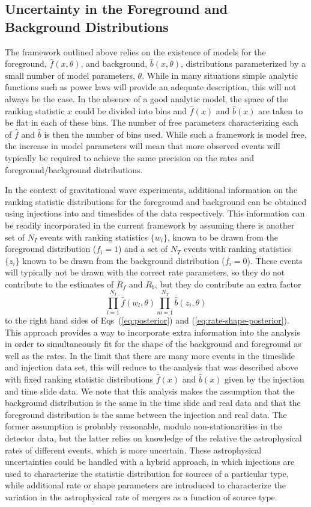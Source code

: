 \documentclass[aps,prd,reprint,nofootinbib]{revtex4-1}
\newcommand{\be}{\begin{equation}}
\newcommand{\ee}{\end{equation}}
\begin{document}
\subsection{Uncertainty in the Foreground and Background Distributions}
\label{sec:uncertain-dist}
The framework outlined above relies on the existence of models for the foreground, $\hat{f}(x,\theta)$, and background, $\hat{b}(x,\theta)$, distributions parameterized by a small number of model parameters, $\theta$. While in many situations simple analytic functions such as power laws will provide an adequate description, this will not always be the case. In the absence of a good analytic model, the space of the ranking statistic $x$ could be divided into bins and $\hat{f}(x)$ and $\hat{b}(x)$ are taken to be flat in each of these bins. The number of free parameters characterizing each of $\hat{f}$ and $\hat{b}$ is then the number of bins used. While such a framework is model free, the increase in model parameters will mean that more observed events will typically be required to achieve the same precision on the rates and foreground/background distributions.

In the context of gravitational wave experiments, additional information on the ranking statistic distributions for the foreground and background can be obtained using injections into and timeslides of the data respectively. This information can be readily incorporated in the current framework by assuming there is another set of $N_I$ events with ranking statistics $\{ w_i \}$, known to be drawn from the foreground distribution ($f_i=1$) and a set of $N_T$ events with ranking statistics $\{z_i\}$ known to be drawn from the background distribution ($f_i=0$). These events will typically not be drawn with the correct rate parameters, so they do not contribute to the estimates of $R_f$ and $R_b$, but they do contribute an extra factor
\be
\prod_{l=1}^{N_I} \hat{f}(w_l, \theta ) \prod_{m=1}^{N_T} \hat{b}(z_i, \theta) 
\ee
to the right hand sides of Eqs~(\ref{eq:posterior}) and (\ref{eq:rate-shape-posterior}). This approach provides a way to incorporate extra information into the analysis in order to simultaneously fit for the shape of the background and foreground as well as the rates. In the limit that there are many more events in the timeslide and injection data set, this will reduce to the analysis that was described above with fixed ranking statistic distributions $\hat{f}(x)$ and $\hat{b}(x)$ given by the injection and time slide data. We note that this analysis makes the assumption that the background distribution is the same in the time slide and real data and that the foreground distribution is the same between the injection and real data. The former assumption is probably reasonable, modulo non-stationarities in the detector data, but the latter relies on knowledge of the relative the astrophysical rates of different events, which is more uncertain. These astrophysical uncertainties could be handled with a hybrid approach, in which injections are used to characterize the statistic distribution for sources of a particular type, while additional rate or shape parameters are introduced to characterize the variation in the astrophysical rate of mergers as a function of source type.
\end{document}
